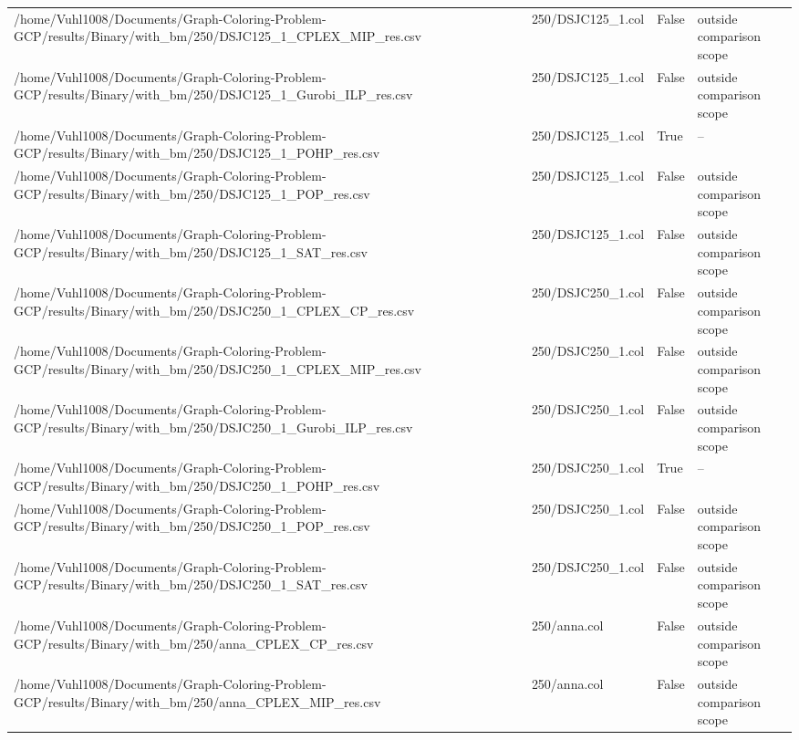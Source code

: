 \begin{table}[htbp]
\begin{tabular}{llll}
/home/Vuhl1008/Documents/Graph-Coloring-Problem-GCP/results/Binary/with\_bm/250/DSJC125\_1\_CPLEX\_MIP\_res.csv & 250/DSJC125\_1.col & False & outside comparison scope \\
/home/Vuhl1008/Documents/Graph-Coloring-Problem-GCP/results/Binary/with\_bm/250/DSJC125\_1\_Gurobi\_ILP\_res.csv & 250/DSJC125\_1.col & False & outside comparison scope \\
/home/Vuhl1008/Documents/Graph-Coloring-Problem-GCP/results/Binary/with\_bm/250/DSJC125\_1\_POHP\_res.csv & 250/DSJC125\_1.col & True & -- \\
/home/Vuhl1008/Documents/Graph-Coloring-Problem-GCP/results/Binary/with\_bm/250/DSJC125\_1\_POP\_res.csv & 250/DSJC125\_1.col & False & outside comparison scope \\
/home/Vuhl1008/Documents/Graph-Coloring-Problem-GCP/results/Binary/with\_bm/250/DSJC125\_1\_SAT\_res.csv & 250/DSJC125\_1.col & False & outside comparison scope \\
/home/Vuhl1008/Documents/Graph-Coloring-Problem-GCP/results/Binary/with\_bm/250/DSJC250\_1\_CPLEX\_CP\_res.csv & 250/DSJC250\_1.col & False & outside comparison scope \\
/home/Vuhl1008/Documents/Graph-Coloring-Problem-GCP/results/Binary/with\_bm/250/DSJC250\_1\_CPLEX\_MIP\_res.csv & 250/DSJC250\_1.col & False & outside comparison scope \\
/home/Vuhl1008/Documents/Graph-Coloring-Problem-GCP/results/Binary/with\_bm/250/DSJC250\_1\_Gurobi\_ILP\_res.csv & 250/DSJC250\_1.col & False & outside comparison scope \\
/home/Vuhl1008/Documents/Graph-Coloring-Problem-GCP/results/Binary/with\_bm/250/DSJC250\_1\_POHP\_res.csv & 250/DSJC250\_1.col & True & -- \\
/home/Vuhl1008/Documents/Graph-Coloring-Problem-GCP/results/Binary/with\_bm/250/DSJC250\_1\_POP\_res.csv & 250/DSJC250\_1.col & False & outside comparison scope \\
/home/Vuhl1008/Documents/Graph-Coloring-Problem-GCP/results/Binary/with\_bm/250/DSJC250\_1\_SAT\_res.csv & 250/DSJC250\_1.col & False & outside comparison scope \\
/home/Vuhl1008/Documents/Graph-Coloring-Problem-GCP/results/Binary/with\_bm/250/anna\_CPLEX\_CP\_res.csv & 250/anna.col & False & outside comparison scope \\
/home/Vuhl1008/Documents/Graph-Coloring-Problem-GCP/results/Binary/with\_bm/250/anna\_CPLEX\_MIP\_res.csv & 250/anna.col & False & outside comparison scope \\

\end{tabular}
\end{table}
